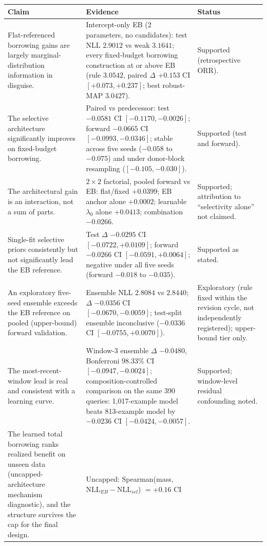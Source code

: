 \documentclass[11pt]{article}
\begin{document}
\begin{longtable}{p{} p{} p{}}
\toprule
\textbf{Claim} & \textbf{Evidence} & \textbf{Status} \\
\midrule
\endhead
Flat-referenced borrowing gains are largely marginal-distribution information
in disguise. & Intercept-only EB (2 parameters, no candidates): test NLL
$2.9012$ vs weak $3.1641$; every fixed-budget borrowing construction at or
above EB (rule $3.0542$, paired $\Delta$ $+0.153$ CI $[+0.073,+0.237]$; best
robust-MAP $3.0427$). & Supported (retrospective ORR). \\
The selective architecture significantly improves on fixed-budget borrowing.
& Paired vs predecessor: test $-0.0581$ CI $[-0.1170,-0.0026]$; forward
$-0.0665$ CI $[-0.0993,-0.0346]$; stable across five seeds ($-0.058$ to
$-0.075$) and under donor-block resampling ($[-0.105,-0.030]$). & Supported
(test and forward). \\
The architectural gain is an interaction, not a sum of parts. & $2\times2$
factorial, pooled forward vs EB: flat/fixed $+0.0399$; EB anchor alone
$+0.0002$; learnable $\lambda_0$ alone $+0.0413$; combination $-0.0266$. &
Supported; attribution to ``selectivity alone'' not claimed. \\
Single-fit selective priors consistently but not significantly lead the EB
reference. & Test $\Delta$ $-0.0295$ CI $[-0.0722,+0.0109]$; forward
$-0.0266$ CI $[-0.0591,+0.0064]$; negative under all five seeds (forward
$-0.018$ to $-0.035$). & Supported as stated. \\
An exploratory five-seed ensemble exceeds the EB reference on pooled
(upper-bound) forward validation. & Ensemble NLL $2.8084$ vs $2.8440$;
$\Delta$ $-0.0356$
CI $[-0.0670,-0.0059]$; test-split
ensemble inconclusive ($-0.0336$ CI $[-0.0755,+0.0070]$). & Exploratory
(rule fixed within the revision cycle, not independently registered);
upper-bound tier only. \\
The most-recent-window lead is real and consistent with a learning curve. &
Window-3 ensemble $\Delta$ $-0.0480$, Bonferroni $98.33\%$ CI
$[-0.0947,-0.0024]$; composition-controlled comparison on the same 390
queries: 1{,}017-example model beats 813-example model by $-0.0236$ CI
$[-0.0424,-0.0057]$. & Supported; window-level residual confounding noted. \\
The learned total borrowing ranks realized benefit on unseen data
(uncapped-architecture mechanism diagnostic), and the structure
survives the cap for the final design. &
Uncapped: Spearman(mass, $\mathrm{NLL}_{EB}-\mathrm{NLL}_{sel}$) $= +0.16$ CI

\end{longtable}
\end{document}

